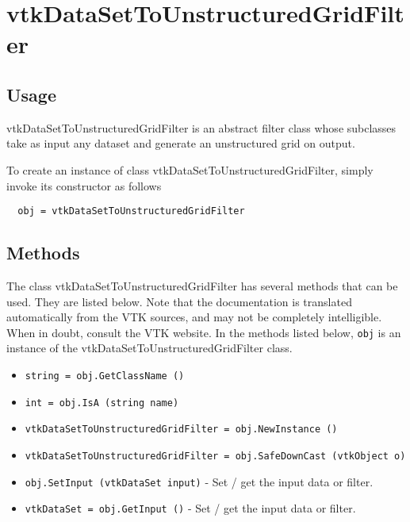 \section{vtkDataSetToUnstructuredGridFilter}

\subsection{Usage}

 vtkDataSetToUnstructuredGridFilter is an abstract filter class whose 
 subclasses take as input any dataset and generate an unstructured
 grid on output.

To create an instance of class vtkDataSetToUnstructuredGridFilter, simply
invoke its constructor as follows
\begin{verbatim}
  obj = vtkDataSetToUnstructuredGridFilter
\end{verbatim}
\subsection{Methods}

The class vtkDataSetToUnstructuredGridFilter has several methods that can be used.
  They are listed below.
Note that the documentation is translated automatically from the VTK sources,
and may not be completely intelligible.  When in doubt, consult the VTK website.
In the methods listed below, \verb|obj| is an instance of the vtkDataSetToUnstructuredGridFilter class.
\begin{itemize}
\item  \verb|string = obj.GetClassName ()|

\item  \verb|int = obj.IsA (string name)|

\item  \verb|vtkDataSetToUnstructuredGridFilter = obj.NewInstance ()|

\item  \verb|vtkDataSetToUnstructuredGridFilter = obj.SafeDownCast (vtkObject o)|

\item  \verb|obj.SetInput (vtkDataSet input)| -  Set / get the input data or filter.

\item  \verb|vtkDataSet = obj.GetInput ()| -  Set / get the input data or filter.

\end{itemize}
